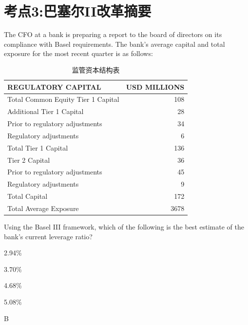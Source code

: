 \documentclass{article}
\newcounter{question} %
\begin{document}
\section{考点3:巴塞尔II改革摘要}
\setcounter{question}{0}
\begin{question}
    The CFO at a bank is preparing a report to the board of directors on its compliance with Basel requirements. The bank's average capital and total exposure for the most recent quarter is as follows:

    \begin{table}[htbp]
        \centering
        \begin{tabular}{|l|r|}
            \hline
            \textbf{REGULATORY CAPITAL} & \textbf{USD MILLIONS} \\
            \hline
            Total Common Equity Tier 1 Capital & 108 \\
            \hline
            Additional Tier 1 Capital & 28 \\
            \quad Prior to regulatory adjustments & 34 \\
            \quad Regulatory adjustments & 6 \\
            \hline
            Total Tier 1 Capital & 136 \\
            \hline
            Tier 2 Capital & 36 \\
            \quad Prior to regulatory adjustments & 45 \\
            \quad Regulatory adjustments & 9 \\
            \hline
            Total Capital & 172 \\
            Total Average Exposure & 3678 \\
            \hline
        \end{tabular}
        \caption{监管资本结构表}
    \end{table}
    Using the Basel III framework, which of the following is the best estimate of the bank's current leverage ratio?
\end{question}

\begin{choices}
    \item 2.94\%
    \item 3.70\%
    \item 4.68\%
    \item 5.08\%
\end{choices}

\begin{correctanswer}
    B
\end{correctanswer}
\end{document}
